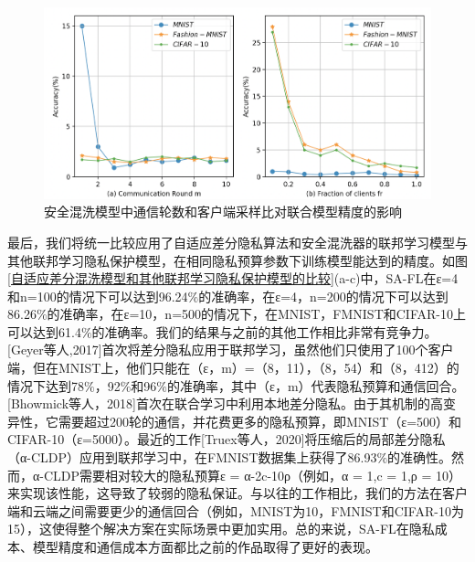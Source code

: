 \begin{figure}[!hbt]
\centering
  	\includegraphics[scale=0.4]{fig2/C5/SA-FL2}%
	\caption{安全混洗模型中通信轮数和客户端采样比对联合模型精度的影响}
  	\label{fig:安全混洗模型中通信轮数和客户端采样比对联合模型精度的影响} 
\end{figure}

最后，我们将统一比较应用了自适应差分隐私算法和安全混洗器的联邦学习模型与其他联邦学习隐私保护模型，在相同隐私预算参数下训练模型能达到的精度。如图\ref{自适应差分混洗模型和其他联邦学习隐私保护模型的比较}(a-c)中，SA-FL在ε=4和n=100的情况下可以达到96.24$\%$的准确率，在ε=4，n=200的情况下可以达到86.26$\%$的准确率，在ε=10，n=500的情况下，在MNIST，FMNIST和CIFAR-10上可以达到61.4$\%$的准确率。我们的结果与之前的其他工作相比非常有竞争力。[Geyer等人,2017]首次将差分隐私应用于联邦学习，虽然他们只使用了100个客户端，但在MNIST上，他们只能在（ε，m）=（8，11），（8，54）和（8，412）的情况下达到78$\%$，92$\%$和96$\%$的准确率，其中（ε，m）代表隐私预算和通信回合。[Bhowmick等人，2018]首次在联合学习中利用本地差分隐私。由于其机制的高变异性，它需要超过200轮的通信，并花费更多的隐私预算，即MNIST（ε=500）和CIFAR-10（ε=5000）。最近的工作[Truex等人，2020]将压缩后的局部差分隐私（α-CLDP）应用到联邦学习中，在FMNIST数据集上获得了86.93$\%$的准确性。然而，α-CLDP需要相对较大的隐私预算ε = α-2c-10ρ（例如，α = 1,c = 1,ρ = 10）来实现该性能，这导致了较弱的隐私保证。与以往的工作相比，我们的方法在客户端和云端之间需要更少的通信回合（例如，MNIST为10，FMNIST和CIFAR-10为15），这使得整个解决方案在实际场景中更加实用。总的来说，SA-FL在隐私成本、模型精度和通信成本方面都比之前的作品取得了更好的表现。


